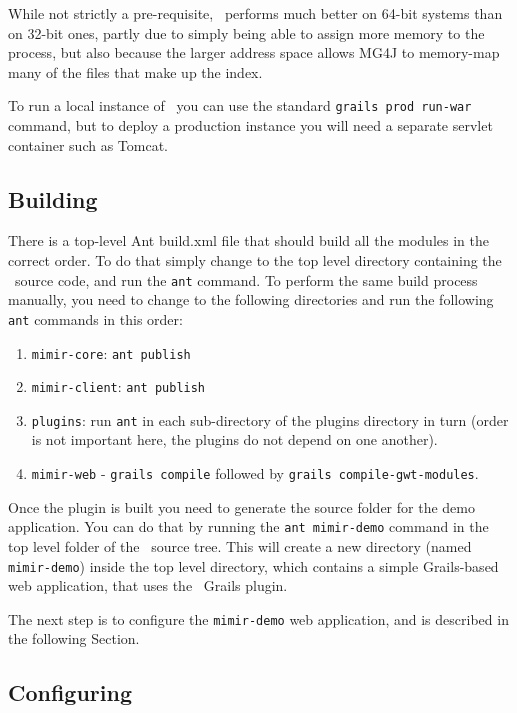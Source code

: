 While not strictly a pre-requisite, \Mimir\ performs much better on 64-bit
systems than on 32-bit ones, partly due to simply being able to assign more
memory to the process, but also because the larger address space allows MG4J to
memory-map many of the files that make up the index.

To run a local instance of \Mimir\ you can use the standard {\tt grails prod
run-war} command, but to deploy a production instance you will need a separate
servlet container such as Tomcat.

\subsection{Building}

There is a top-level Ant build.xml file that should build all the modules in
the correct order. To do that simply change to the top level directory
containing the \Mimir\ source code, and run the {\tt ant} command. To perform
the same build process manually, you need to change to the following directories
and run the following {\tt ant} commands in this order:
\begin{enumerate}
\item {\tt mimir-core}: {\tt ant publish}
\item {\tt mimir-client}: {\tt ant publish}
\item {\tt plugins}: run {\tt ant} in each sub-directory of the plugins
  directory in turn (order is not important here, the plugins do not depend on
  one another).
\item {\tt mimir-web} - {\tt grails compile} followed by {\tt grails
  compile-gwt-modules}.
\end{enumerate}

Once the plugin is built you need to generate the source folder for the demo
application. You can do that by running the {\tt ant mimir-demo} command in the
top level folder of the \Mimir\ source tree. This will create a new directory
(named {\tt mimir-demo}) inside the top level directory, which contains a simple
Grails-based web application, that uses the \Mimir\ Grails plugin.

The next step is to configure the {\tt mimir-demo} web application, and is
described in the following Section.

\subsection{Configuring}\label{sec:admin:config}

